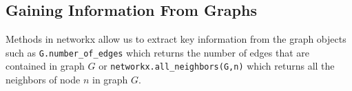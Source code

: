 \documentclass{article}
\begin{document}
        \subsection{Gaining Information From Graphs}
        Methods in networkx allow us to extract key information from the graph objects such as \verb|G.number_of_edges| which returns the number of edges that are contained in graph $G$ or \verb|networkx.all_neighbors(G,n)| which returns all the neighbors of node $n$ in graph $G$.
            
    
    
\printbibliography
\end{document}
